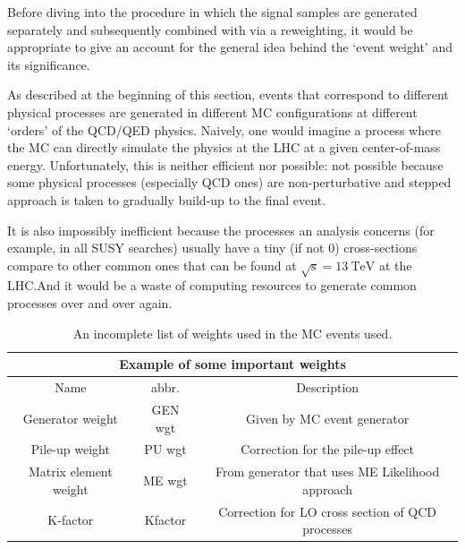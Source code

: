 Before diving into the procedure in which the signal samples are generated separately and
subsequently combined with via a reweighting, it would be appropriate to give
an account for the general idea behind the `event weight' and its significance.

As described at the beginning of this section, events that correspond to different physical
processes are generated in different MC configurations at different `orders' of the QCD/QED physics.
Naively, one would imagine a process where the MC can directly simulate the physics at
the LHC at a given center-of-mass energy. Unfortunately, this is neither efficient nor possible:
not possible because some physical processes (especially QCD ones) are non-perturbative and
stepped approach is taken to gradually build-up to the final event.

It is also impossibly inefficient because the processes an analysis concerns (for example, in all SUSY
searches) usually have a tiny (if not 0) cross-sections compare to other common ones that can be
found at
$\sqrt{\mathrm{s}} = \SI{13}{\tera\electronvolt}$ at the LHC.\@ And it would be a waste of
computing resources to generate common processes over and over again.

\begin{table}[]
\centering
\begin{tabular}{|c|c|c|}
\hline
\multicolumn{3}{|c|}{Example of some important weights}                                                                                       \\ \hline
Name                  & abbr.   & Description                                                                                                 \\ \hline
Generator weight      & GEN wgt & Given by MC event generator                                                                                 \\ \hline
Pile-up weight        & PU wgt  & Correction for the pile-up effect                                                                           \\ \hline
Matrix element weight & ME wgt  & From generator that uses ME Likelihood approach \\ \hline
K-factor              & Kfactor & Correction for LO cross section of QCD processes                                                         \\ \hline
\end{tabular}
\caption{An incomplete list of weights used in the MC events used.}
\label{tab:MC_wgts}
\end{table}

